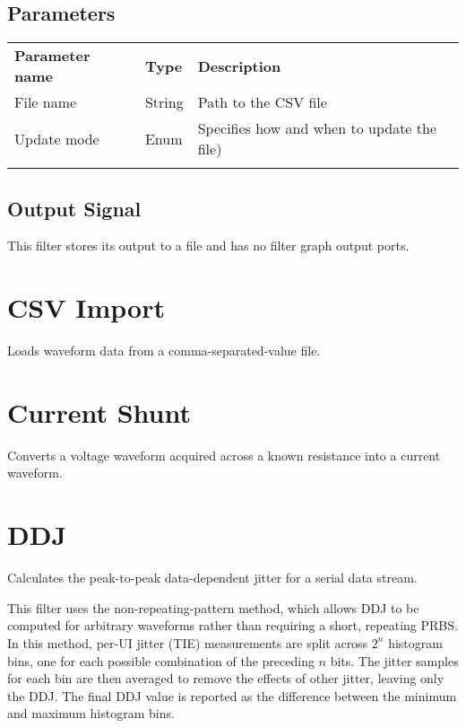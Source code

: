 \subsection{Parameters}

\begin{tabularx}{16cm}{llX}
\thickhline
\textbf{Parameter name} & \textbf{Type} & \textbf{Description} \\
\thickhline
File name & String & Path to the CSV file\\
\thinhline
Update mode & Enum & Specifies how and when to update the file)\\
\thickhline
\end{tabularx}

\subsection{Output Signal}

This filter stores its output to a file and has no filter graph output ports.

\pagebreak
\section{CSV Import}

Loads waveform data from a comma-separated-value file.


\pagebreak
\section{Current Shunt}

Converts a voltage waveform acquired across a known resistance into a current waveform.

\pagebreak
\section{DDJ}
\label{filter:ddj}

Calculates the peak-to-peak data-dependent jitter for a serial data stream.

This filter uses the non-repeating-pattern method, which allows DDJ to be computed for arbitrary waveforms rather than
requiring a short, repeating PRBS. In this method, per-UI jitter (TIE) measurements are split across $2^n$ histogram
bins, one for each possible combination of the preceding $n$ bits. The jitter samples for each bin are then averaged to
remove the effects of other jitter, leaving only the DDJ.  The final DDJ value is reported as the difference between
the minimum and maximum histogram bins.

